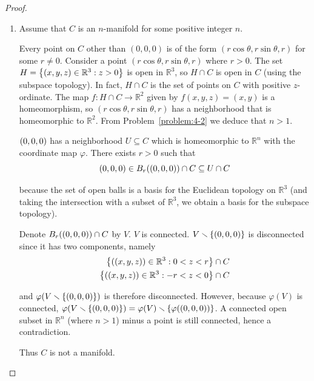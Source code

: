 \begin{proof}
\begin{enumerate}[label={(\alph*)}]
		      but $\varphi(W\smallsetminus\set{0}) \subseteq \mathbb{R}$ has two path components (because it is an open interval minus a point), which is a contradiction.

		      Thus $M$ is not a manifold.
		\item Assume that $C$ is an $n$-manifold for some positive integer $n$.

		      Every point on $C$ other than $(0, 0, 0)$ is of the form $(r\cos\theta, r\sin\theta, r)$ for some $r\ne 0$. Consider a point $(r\cos\theta, r\sin\theta, r)$ where $r > 0$. The set $H = \left\{{ \left({x, y, z}\right) \in \mathbb{R}^{3} : z > 0 }\right\}$ is open in $\mathbb{R}^{3}$, so $H \cap C$ is open in $C$ (using the subspace topology). In fact, $H\cap C$ is the set of points on $C$ with positive $z$-ordinate. The map $f: H\cap C \to \mathbb{R}^{2}$ given by $f(x, y, z) = (x, y)$ is a homeomorphism, so $(r\cos\theta, r\sin\theta, r)$ has a neighborhood that is homeomorphic to $\mathbb{R}^{2}$. From Problem~\ref{problem:4-2} we deduce that $n > 1$.

		      $\left({0, 0, 0}\right)$ has a neighborhood $U \subseteq C$ which is homeomorphic to $\mathbb{R}^{n}$ with the coordinate map $\varphi$. There exists $r > 0$ such that
		      \begin{equation*}
			      \left({0,0,0}\right) \in B_{r}(\left({0,0,0}\right)) \cap C \subseteq U \cap C
		      \end{equation*}

		      because the set of open balls is a basis for the Euclidean topology on $\mathbb{R}^{3}$ (and taking the intersection with a subset of $\mathbb{R}^{3}$, we obtain a basis for the subspace topology).

		      Denote $B_{r}(\left({0,0,0}\right)) \cap C$ by $V$. $V$ is connected. $V\smallsetminus\left\{{\left({0,0,0}\right)}\right\}$ is disconnected since it has two components, namely
		      \begin{equation*}
			      \begin{split}
				      \left\{{\left({(x, y, z)}\right) \in \mathbb{R}^{3} : 0 < z < r}\right\} \cap C \\
				      \left\{{\left({(x, y, z)}\right) \in \mathbb{R}^{3} : -r < z < 0}\right\} \cap C
			      \end{split}
		      \end{equation*}

		      and $\varphi(V \smallsetminus \left\{{\left({0,0,0}\right)}\right\})$ is therefore disconnected. However, because $\varphi(V)$ is connected, $\varphi(V \smallsetminus \left\{{\left({0,0,0}\right)}\right\}) = \varphi(V) \smallsetminus\left\{{\varphi(\left({0,0,0}\right))}\right\}$. A connected open subset in $\mathbb{R}^{n}$ (where $n > 1$) minus a point is still connected, hence a contradiction.

		      Thus $C$ is not a manifold.
	\end{enumerate}
\end{proof}

